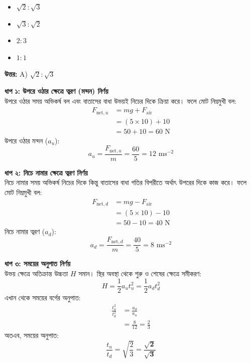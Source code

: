 \documentclass[12pt, a4paper]{article}
\begin{document}
\begin{itemize}[label={}, leftmargin=1cm, itemsep=0.5em]
    \item[\textbf{A)}]  $\sqrt{2} : \sqrt{3}$
    \item[\textbf{B)}] $\sqrt{3} : \sqrt{2}$
    \item[\textbf{C)}]  $2 : 3$
    \item[\textbf{D)}]  $1 : 1$
\end{itemize}

\vspace{0.5em}
\begin{tcolorbox}[answerbox]
    \textbf{\color{success} উত্তর:} A) $\sqrt{2} : \sqrt{3}$
\end{tcolorbox}
\vspace{1em}

\begin{tcolorbox}[solutionbox={সমাধান (Solution)}]
    \noindent
    \textbf{ধাপ ১: উপরে ওঠার ক্ষেত্রে ত্বরণ (মন্দন) নির্ণয়} \\
    উপরে ওঠার সময় অভিকর্ষ বল এবং বাতাসের বাধা উভয়ই নিচের দিকে ক্রিয়া করে। ফলে মোট নিম্নমুখী বল:
    \begin{align*}
        F_{\text{net}, u} &= mg + F_{\text{air}} \\
        &= (5 \times 10) + 10 \\
        &= 50 + 10 = 60\text{ N}
    \end{align*}
    উপরে ওঠার মন্দন ($a_u$):
    \[ a_u = \frac{F_{\text{net}, u}}{m} = \frac{60}{5} = 12\text{ ms}^{-2} \]
    
    \vspace{0.5em}
    \noindent\textbf{ধাপ ২: নিচে নামার ক্ষেত্রে ত্বরণ নির্ণয়} \\
    নিচে নামার সময় অভিকর্ষ নিচের দিকে কিন্তু বাতাসের বাধা গতির বিপরীতে অর্থাৎ উপরের দিকে কাজ করে। ফলে মোট নিম্নমুখী বল:
    \begin{align*}
        F_{\text{net}, d} &= mg - F_{\text{air}} \\
        &= (5 \times 10) - 10 \\
        &= 50 - 10 = 40\text{ N}
    \end{align*}
    নিচে নামার ত্বরণ ($a_d$):
    \[ a_d = \frac{F_{\text{net}, d}}{m} = \frac{40}{5} = 8\text{ ms}^{-2} \]
    
    \vspace{0.5em}
    \noindent\textbf{ধাপ ৩: সময়ের অনুপাত নির্ণয়} \\
    উভয় ক্ষেত্রে অতিক্রান্ত উচ্চতা $H$ সমান। স্থির অবস্থা থেকে শুরু ও শেষের ক্ষেত্রে সমীকরণ:
    \[ H = \frac{1}{2} a_u t_u^2 = \frac{1}{2} a_d t_d^2 \]
    এখান থেকে সময়ের বর্গের অনুপাত:
    \begin{align*}
        \frac{t_u^2}{t_d^2} &= \frac{a_d}{a_u} \\
        &= \frac{8}{12} = \frac{2}{3}
    \end{align*}
    অতএব, সময়ের অনুপাত:
    \[ \frac{t_u}{t_d} = \sqrt{\frac{2}{3}} = \mathbf{\frac{\sqrt{2}}{\sqrt{3}}} \]
\end{tcolorbox}
\end{document}
